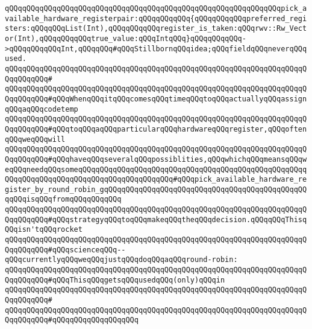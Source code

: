 \verb|qQQqqQQqqQQqqQQqqQQqqQQqqQQqqQQqqQQqqQQqqQQqqQQqqQQqqQQqqQQqqQQqpick_available_hardware_registerpair:qQQqqQQqqQQq{qQQqqQQqqQQqpreferred_registers:qQQqqQQqList(Int),qQQqqQQqqQQqregister_is_taken:qQQqrwv::Rw_Vector(Int),qQQqqQQqqQQqtrue_value:qQQqIntqQQq}qQQqqQQqqQQq->qQQqqQQqqQQqInt,qQQqqQQq#qQQqStillbornqQQqidea;qQQqfieldqQQqneverqQQqused.|\newline
\verb|qQQqqQQqqQQqqQQqqQQqqQQqqQQqqQQqqQQqqQQqqQQqqQQqqQQqqQQqqQQqqQQqqQQqqQQqqQQqqQQq#|\newline
\verb|qQQqqQQqqQQqqQQqqQQqqQQqqQQqqQQqqQQqqQQqqQQqqQQqqQQqqQQqqQQqqQQqqQQqqQQqqQQqqQQq#qQQqWhenqQQqitqQQqcomesqQQqtimeqQQqtoqQQqactuallyqQQqassignqQQqaqQQqcodetemp|\newline
\verb|qQQqqQQqqQQqqQQqqQQqqQQqqQQqqQQqqQQqqQQqqQQqqQQqqQQqqQQqqQQqqQQqqQQqqQQqqQQqqQQq#qQQqtoqQQqaqQQqparticularqQQqhardwareqQQqregister,qQQqoftenqQQqweqQQqwill|\newline
\verb|qQQqqQQqqQQqqQQqqQQqqQQqqQQqqQQqqQQqqQQqqQQqqQQqqQQqqQQqqQQqqQQqqQQqqQQqqQQqqQQq#qQQqhaveqQQqseveralqQQqpossiblities,qQQqwhichqQQqmeansqQQqweqQQqneedqQQqsomeqQQqqQQqqQQqqQQqqQQqqQQqqQQqqQQqqQQqqQQqqQQqqQQqqQQqqQQqqQQqqQQqqQQqqQQqqQQqqQQqqQQqqQQqqQQq#qQQqpick_available_hardware_register_by_round_robin_gqQQqqQQqqQQqqQQqqQQqqQQqqQQqqQQqqQQqqQQqqQQqqQQqqQQqisqQQqfromqQQqqQQqqQQq|\newline
\verb|qQQqqQQqqQQqqQQqqQQqqQQqqQQqqQQqqQQqqQQqqQQqqQQqqQQqqQQqqQQqqQQqqQQqqQQqqQQqqQQq#qQQqstrategyqQQqtoqQQqmakeqQQqtheqQQqdecision.qQQqqQQqThisqQQqisn'tqQQqrocket|\newline
\verb|qQQqqQQqqQQqqQQqqQQqqQQqqQQqqQQqqQQqqQQqqQQqqQQqqQQqqQQqqQQqqQQqqQQqqQQqqQQqqQQq#qQQqscienceqQQq--qQQqcurrentlyqQQqweqQQqjustqQQqdoqQQqaqQQqround-robin:|\newline
\verb|qQQqqQQqqQQqqQQqqQQqqQQqqQQqqQQqqQQqqQQqqQQqqQQqqQQqqQQqqQQqqQQqqQQqqQQqqQQqqQQq#qQQqThisqQQqgetsqQQqusedqQQq(only)qQQqin|\newline
\verb|qQQqqQQqqQQqqQQqqQQqqQQqqQQqqQQqqQQqqQQqqQQqqQQqqQQqqQQqqQQqqQQqqQQqqQQqqQQqqQQq#|\newline
\verb|qQQqqQQqqQQqqQQqqQQqqQQqqQQqqQQqqQQqqQQqqQQqqQQqqQQqqQQqqQQqqQQqqQQqqQQqqQQqqQQq#qQQqqQQqqQQqqQQqqQQq|\newline

